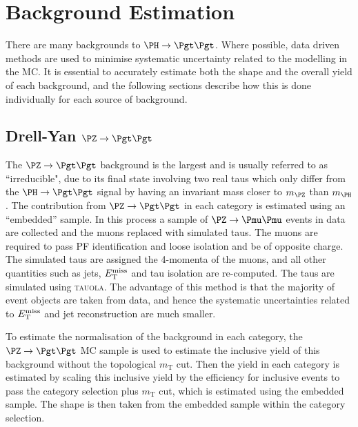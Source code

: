 \section{Background Estimation}
\label{sec:backgrounds}

There are many backgrounds to $\HToTauTau$. Where possible, data driven methods
are used to minimise systematic uncertainty related to the modelling in the
\ac{MC}. It is essential to accurately estimate both the shape and the overall
yield of each background, and the following sections describe how this is done
individually for each source of background.

\subsection{Drell-Yan $\PZ \to\Pgt\Pgt$}
\label{sec:backgroundEstimation_Ztautau}

The $\PZ \to \Pgt\Pgt$ background is the largest and is usually referred to as ``irreducible", due to its final
state involving two real taus which only differ from the $\PH \to \Pgt\Pgt$ signal by
having an invariant mass closer to $m_{\PZ}$ than $m_{\PH}$.
The contribution from $\ZToTauTau$ in each category is estimated using an
``embedded'' sample. In this process a sample of $\PZ\to\Pmu\Pmu$ events in data are
collected and the muons replaced with simulated taus. The muons are required
to pass \ac{PF} identification and loose isolation and be of opposite charge.
The simulated taus are assigned the 4-momenta of the muons, and all other
quantities such as jets, $E_{\mathrm{T}}^{\text{miss}}$ and tau isolation are re-computed. The taus
are simulated using \textsc{tauola}. 
The advantage of this method is that the majority of event objects
are taken from data, and hence the systematic uncertainties related to $E_{\mathrm{T}}^{\text{miss}}$
and jet reconstruction are much smaller. 

To estimate the normalisation of the background in each category, 
the $\ZToTauTau$ \ac{MC} sample is used to estimate 
the inclusive yield of this background without the topological $m_{\text{T}}$
cut. Then the yield in each category is estimated by scaling this inclusive yield by the efficiency for 
inclusive events to pass the category selection plus $m_{\text{T}}$ cut, which is estimated using the
embedded sample. The shape is then taken from the embedded sample within the
category selection.


